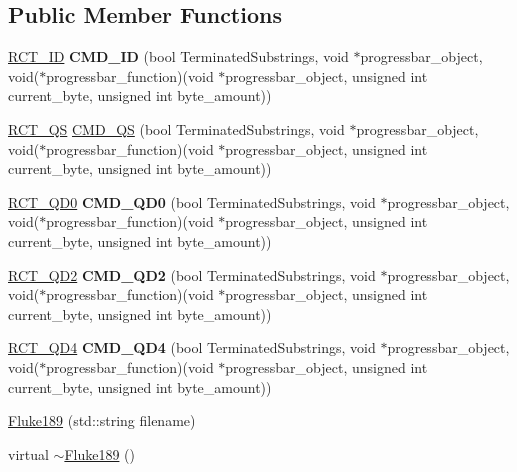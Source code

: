 \subsection*{Public Member Functions}
\begin{DoxyCompactItemize}
\item 
\hypertarget{classFluke_1_1Fluke189_aa08fa7232a4af887744b63f59959b050}{
\hyperlink{classFluke_1_1Fluke189_a07788d6f33a7dd54b3a66373b5addded}{RCT\_\-ID} {\bfseries CMD\_\-ID} (bool TerminatedSubstrings, void $\ast$progressbar\_\-object, void($\ast$progressbar\_\-function)(void $\ast$progressbar\_\-object, unsigned int current\_\-byte, unsigned int byte\_\-amount))}
\label{classFluke_1_1Fluke189_aa08fa7232a4af887744b63f59959b050}

\item 
\hyperlink{classFluke_1_1Fluke189_a9fee860a536aaaa113af0248791e9fef}{RCT\_\-QS} \hyperlink{classFluke_1_1Fluke189_a5747ae5dbcc0d078566dd8ff28c3d6b5}{CMD\_\-QS} (bool TerminatedSubstrings, void $\ast$progressbar\_\-object, void($\ast$progressbar\_\-function)(void $\ast$progressbar\_\-object, unsigned int current\_\-byte, unsigned int byte\_\-amount))
\item 
\hypertarget{classFluke_1_1Fluke189_ac33f3b840c907949b5b7e479f65c11d5}{
\hyperlink{classFluke_1_1Fluke189_a9a5b405bb506cd2482de2f8bb0bea189}{RCT\_\-QD0} {\bfseries CMD\_\-QD0} (bool TerminatedSubstrings, void $\ast$progressbar\_\-object, void($\ast$progressbar\_\-function)(void $\ast$progressbar\_\-object, unsigned int current\_\-byte, unsigned int byte\_\-amount))}
\label{classFluke_1_1Fluke189_ac33f3b840c907949b5b7e479f65c11d5}

\item 
\hypertarget{classFluke_1_1Fluke189_afca3f8241ae8dc89691b0fb8f5d3cbad}{
\hyperlink{classFluke_1_1Fluke189_a6dcb8bdb7e09aba26dd95d49f56690cf}{RCT\_\-QD2} {\bfseries CMD\_\-QD2} (bool TerminatedSubstrings, void $\ast$progressbar\_\-object, void($\ast$progressbar\_\-function)(void $\ast$progressbar\_\-object, unsigned int current\_\-byte, unsigned int byte\_\-amount))}
\label{classFluke_1_1Fluke189_afca3f8241ae8dc89691b0fb8f5d3cbad}

\item 
\hypertarget{classFluke_1_1Fluke189_a4e942819669368247858a39003f2bf9f}{
\hyperlink{classFluke_1_1Fluke189_a82ebb2c4106833e320c8b18b968a5e22}{RCT\_\-QD4} {\bfseries CMD\_\-QD4} (bool TerminatedSubstrings, void $\ast$progressbar\_\-object, void($\ast$progressbar\_\-function)(void $\ast$progressbar\_\-object, unsigned int current\_\-byte, unsigned int byte\_\-amount))}
\label{classFluke_1_1Fluke189_a4e942819669368247858a39003f2bf9f}

\item 
\hyperlink{classFluke_1_1Fluke189_a2a8bd6a44e96762e278809e016033e58}{Fluke189} (std::string filename)
\item 
virtual \hyperlink{classFluke_1_1Fluke189_aef4bad0cc4186a053a0dd4286ae3a679}{$\sim$Fluke189} ()
\end{DoxyCompactItemize}


